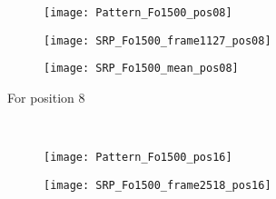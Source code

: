 \begin{figure}
  \begin{subfigure}[t]{0.47\textwidth}
    \begin{minipage}[t]{\textwidth}
      \begin{subfigure}[t]{0.3\textwidth}
        \texttt{[image: Pattern\_Fo1500\_pos08]}
        \label{fig:Pattern_Fo1500_pos08}
      \end{subfigure}
      \begin{subfigure}[t]{0.3\textwidth}
        \texttt{[image: SRP\_Fo1500\_frame1127\_pos08]}
        \label{fig:SRP_pos08}
      \end{subfigure}
      \begin{subfigure}[t]{0.3\textwidth}
        \texttt{[image: SRP\_Fo1500\_mean\_pos08]}
        \label{fig:SRP_Fo1500_mean_pos08}
      \end{subfigure}
      \vspace{\verticalSpacingSRPMaps}
      \caption{\centering For position 8}
      \vspace{0.25cm}
    \end{minipage}
  \end{subfigure}
  ~%
  \begin{subfigure}[t]{0.47\textwidth}
    \begin{minipage}[t]{\textwidth}
      \begin{subfigure}[t]{0.3\textwidth}
        \texttt{[image: Pattern\_Fo1500\_pos16]}
        \label{fig:Pattern_Fo1500_pos16}
      \end{subfigure}
      \begin{subfigure}[t]{0.3\textwidth}
        \texttt{[image: SRP\_Fo1500\_frame2518\_pos16]}

\end{subfigure}
\end{minipage}
\end{subfigure}
\end{figure}
